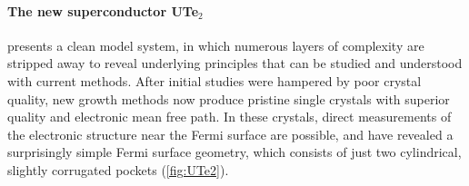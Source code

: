 \paragraph{The new superconductor UTe$_2$} presents a clean model system, in which numerous layers of complexity are stripped away to reveal underlying principles that can be studied and understood with current methods. After initial studies were hampered by poor crystal quality, new growth methods now produce pristine single crystals with superior quality and electronic mean free path. In these crystals, direct measurements of the electronic structure near the Fermi surface are possible, and have revealed a surprisingly simple Fermi surface geometry, which consists of just two cylindrical, slightly corrugated pockets (\autoref{fig:UTe2}).


